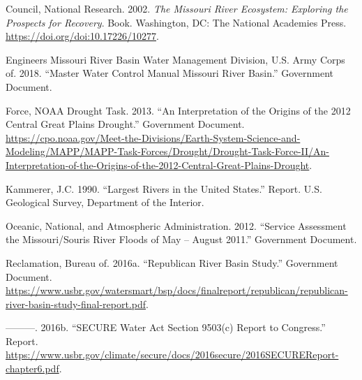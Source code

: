 \documentclass[12pt,]{article}
\begin{document}
\hypertarget{refs}{}
\leavevmode\hypertarget{ref-nrc2002}{}%
Council, National Research. 2002. \emph{The Missouri River Ecosystem:
Exploring the Prospects for Recovery}. Book. Washington, DC: The
National Academies Press. \url{https://doi.org/doi:10.17226/10277}.

\leavevmode\hypertarget{ref-usace2018}{}%
Engineers Missouri River Basin Water Management Division, U.S. Army
Corps of. 2018. ``Master Water Control Manual Missouri River Basin.''
Government Document.

\leavevmode\hypertarget{ref-noaa2013}{}%
Force, NOAA Drought Task. 2013. ``An Interpretation of the Origins of
the 2012 Central Great Plains Drought.'' Government Document.
\url{https://cpo.noaa.gov/Meet-the-Divisions/Earth-System-Science-and-Modeling/MAPP/MAPP-Task-Forces/Drought/Drought-Task-Force-II/An-Interpretation-of-the-Origins-of-the-2012-Central-Great-Plains-Drought}.

\leavevmode\hypertarget{ref-kammerer1990}{}%
Kammerer, J.C. 1990. ``Largest Rivers in the United States.'' Report.
U.S. Geological Survey, Department of the Interior.

\leavevmode\hypertarget{ref-noaa2012}{}%
Oceanic, National, and Atmospheric Administration. 2012. ``Service
Assessment the Missouri/Souris River Floods of May -- August 2011.''
Government Document.

\leavevmode\hypertarget{ref-bor2016-2}{}%
Reclamation, Bureau of. 2016a. ``Republican River Basin Study.''
Government Document.
\url{https://www.usbr.gov/watersmart/bsp/docs/finalreport/republican/republican-river-basin-study-final-report.pdf}.

\leavevmode\hypertarget{ref-bor2016-1}{}%
---------. 2016b. ``SECURE Water Act Section 9503(c) Report to
Congress.'' Report.
\url{https://www.usbr.gov/climate/secure/docs/2016secure/2016SECUREReport-chapter6.pdf}.
\end{document}
